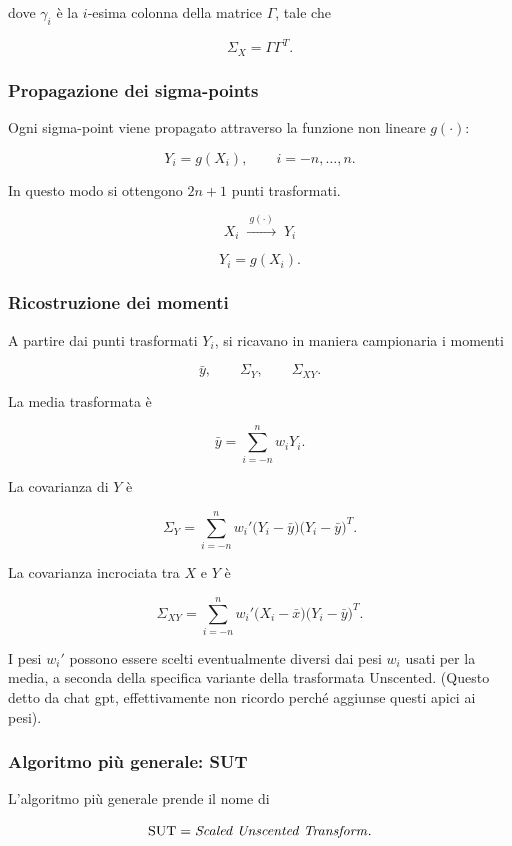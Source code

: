 \documentclass[11pt,a4paper]{article}
\begin{document}
dove \(\gamma_i\) è la \(i\)-esima colonna della matrice \(\Gamma\), tale che

\[
\Sigma_X=\Gamma\Gamma^T.
\]

\subsubsection*{Propagazione dei sigma-points}

Ogni sigma-point viene propagato attraverso la funzione non lineare \(g(\cdot)\):

\[
Y_i=g(X_i),
\qquad i=-n,\dots,n.
\]

In questo modo si ottengono \(2n+1\) punti trasformati.

\[
X_i
\;\xrightarrow{\ g(\cdot)\ }\;
Y_i
\]

\[
Y_i=g(X_i).
\]

\subsubsection*{Ricostruzione dei momenti}

A partire dai punti trasformati \(Y_i\), si ricavano in maniera campionaria i momenti

\[
\bar y,\qquad \Sigma_Y,\qquad \Sigma_{XY}.
\]

La media trasformata è

\[
\bar y
=
\sum_{i=-n}^{n} w_i Y_i.
\]

La covarianza di \(Y\) è

\[
\Sigma_Y
=
\sum_{i=-n}^{n} w_i'
\bigl(Y_i-\bar y\bigr)
\bigl(Y_i-\bar y\bigr)^T.
\]

La covarianza incrociata tra \(X\) e \(Y\) è

\[
\Sigma_{XY}
=
\sum_{i=-n}^{n} w_i'
\bigl(X_i-\bar x\bigr)
\bigl(Y_i-\bar y\bigr)^T.
\]

I pesi \(w_i'\) possono essere scelti eventualmente diversi dai pesi \(w_i\) usati per la media, a seconda della specifica variante della trasformata Unscented. (Questo detto da chat gpt, effettivamente non ricordo perché aggiunse questi  apici ai pesi). 

\subsubsection*{Algoritmo più generale: SUT}

L'algoritmo più generale prende il nome di

\[
\text{SUT} = \text{\emph{Scaled Unscented Transform}}.
\]
\end{document}
